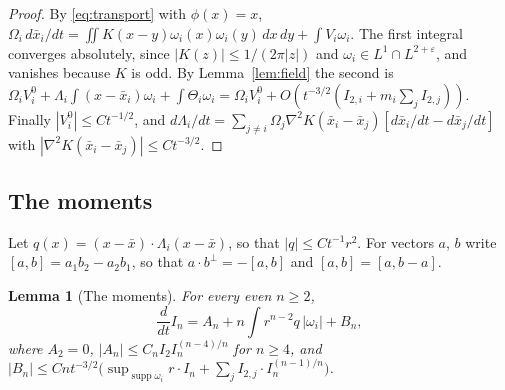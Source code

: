 \documentclass[11pt]{article}
\newtheorem{lemma}{Lemma}
\theoremstyle{definition}
\begin{document}
\begin{proof}
By \eqref{eq:transport} with $\phi(x) = x$, $\Omega_i\,d\bar x_i/dt = \iint K(x - y)\omega_i(x)\omega_i(y)\,dx\,dy + \int V_i\omega_i$. The first integral converges absolutely, since $|K(z)| \le 1/(2\pi|z|)$ and $\omega_i \in L^1 \cap L^{2+\varepsilon}$, and vanishes because $K$ is odd. By Lemma~\ref{lem:field} the second is $\Omega_iV_i^0 + \Lambda_i\int(x - \bar x_i)\omega_i + \int \Theta_i\omega_i = \Omega_iV_i^0 + O(t^{-3/2}(I_{2,i} + m_i\sum_jI_{2,j}))$. Finally $|V_i^0| \le Ct^{-1/2}$, and $d\Lambda_i/dt = \sum_{j\ne i}\Omega_j\nabla^2K(\bar x_i - \bar x_j)[d\bar x_i/dt - d\bar x_j/dt]$ with $|\nabla^2K(\bar x_i - \bar x_j)| \le Ct^{-3/2}$.
\end{proof}

\subsection{The moments}

Let $q(x) = (x - \bar x)\cdot \Lambda_i(x - \bar x)$, so that $|q| \le Ct^{-1}r^2$. For vectors $a$, $b$ write $[a, b] = a_1b_2 - a_2b_1$, so that $a\cdot b^\perp = -[a, b]$ and $[a, b] = [a, b - a]$.

\begin{lemma}[The moments]\label{lem:moments}
For every even $n \ge 2$,
\[
  \frac{d}{dt}I_n = A_n + n\int r^{n-2}q\,|\omega_i| + B_n,
\]
where $A_2 = 0$, $|A_n| \le C_nI_2I_n^{(n-4)/n}$ for $n \ge 4$, and $|B_n| \le Cnt^{-3/2}\bigl(\sup_{\operatorname{supp}\omega_i}r\cdot I_n + \sum_jI_{2,j}\cdot I_n^{(n-1)/n}\bigr)$.
\end{lemma}
\end{document}
